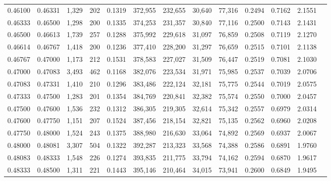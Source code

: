 \begin{tabular}{rrrrrrrrrrrrr}
0.46100 & 0.46331 & 1,329 & 202 &                                     0.1319 & 372,955 & 232,655 &  30,640 &  77,316 & 0.2494 & 0.7162 & 2.1551 \\
0.46333 & 0.46500 & 1,298 & 200 &                                     0.1335 & 374,253 & 231,357 &  30,840 &  77,116 & 0.2500 & 0.7143 & 2.1431 \\
0.46500 & 0.46613 & 1,739 & 257 &                                     0.1288 & 375,992 & 229,618 &  31,097 &  76,859 & 0.2508 & 0.7119 & 2.1270 \\
0.46614 & 0.46767 & 1,418 & 200 &                                     0.1236 & 377,410 & 228,200 &  31,297 &  76,659 & 0.2515 & 0.7101 & 2.1138 \\
0.46767 & 0.47000 & 1,173 & 212 &                                     0.1531 & 378,583 & 227,027 &  31,509 &  76,447 & 0.2519 & 0.7081 & 2.1030 \\
0.47000 & 0.47083 & 3,493 & 462 &                                     0.1168 & 382,076 & 223,534 &  31,971 &  75,985 & 0.2537 & 0.7039 & 2.0706 \\
0.47083 & 0.47331 & 1,410 & 210 &                                     0.1296 & 383,486 & 222,124 &  32,181 &  75,775 & 0.2544 & 0.7019 & 2.0575 \\
0.47333 & 0.47500 & 1,283 & 201 &                                     0.1354 & 384,769 & 220,841 &  32,382 &  75,574 & 0.2550 & 0.7000 & 2.0457 \\
0.47500 & 0.47600 & 1,536 & 232 &                                     0.1312 & 386,305 & 219,305 &  32,614 &  75,342 & 0.2557 & 0.6979 & 2.0314 \\
0.47600 & 0.47750 & 1,151 & 207 &                                     0.1524 & 387,456 & 218,154 &  32,821 &  75,135 & 0.2562 & 0.6960 & 2.0208 \\
0.47750 & 0.48000 & 1,524 & 243 &                                     0.1375 & 388,980 & 216,630 &  33,064 &  74,892 & 0.2569 & 0.6937 & 2.0067 \\
0.48000 & 0.48081 & 3,307 & 504 &                                     0.1322 & 392,287 & 213,323 &  33,568 &  74,388 & 0.2586 & 0.6891 & 1.9760 \\
0.48083 & 0.48333 & 1,548 & 226 &                                     0.1274 & 393,835 & 211,775 &  33,794 &  74,162 & 0.2594 & 0.6870 & 1.9617 \\
0.48333 & 0.48500 & 1,311 & 221 &                                     0.1443 & 395,146 & 210,464 &  34,015 &  73,941 & 0.2600 & 0.6849 & 1.9495 \\

\end{tabular}
